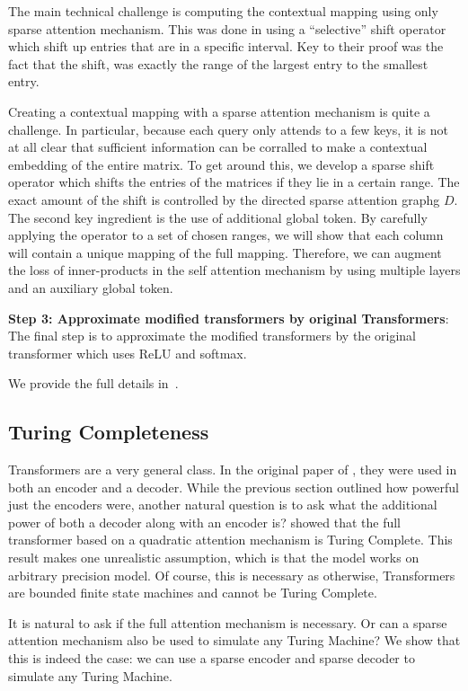     The main technical challenge is computing the contextual mapping using only sparse attention mechanism. 
    This was done in \cite{Yun19} using a ``selective'' shift operator which shift up entries that are in a 
    specific interval. Key to their proof was the fact that the shift, was exactly the range of the largest 
    entry to the smallest entry.  
    
    Creating a contextual mapping with a sparse attention mechanism is quite a challenge.
    In particular, because each query only attends to a few keys, it is not at all clear
    that sufficient information can be corralled to make a contextual embedding of the 
    entire matrix. To get around this, we develop a sparse shift operator which shifts the entries of the matrices if they lie in a certain range. The exact amount of the shift is controlled by the directed sparse attention graphg $D$. The second key ingredient is the use of additional global token.  By carefully applying the operator
    to a set of chosen ranges, we will show that each column will contain a unique mapping of the
    full mapping.   Therefore, we can   
    augment the loss of inner-products in the self attention mechanism by using multiple 
    layers and an auxiliary global token. 
    
\textbf{Step 3: Approximate modified transformers by original Transformers}: The final 
step is to approximate the modified transformers by the original transformer which uses ReLU and 
softmax. 

We provide the full details in~.

\subsection{Turing Completeness}
Transformers are a very general class. In the original paper of \citet{vaswani2017attention}, they were used 
in both an encoder and a decoder. While the previous section outlined how powerful just the encoders were,  another natural question is to ask what the
additional power of both a decoder along with an encoder is? \citet{Perez19} showed that the 
full  transformer based on a quadratic attention mechanism is Turing Complete. This result 
makes one  unrealistic assumption, which is that the model works on arbitrary precision 
model. Of course,  this is necessary as otherwise, Transformers are bounded finite 
state machines and cannot be Turing Complete. 

It is natural to ask if the full attention mechanism is necessary. Or can a 
sparse attention mechanism also be used to simulate any Turing Machine? 
We show that this is indeed the case: we can use a sparse encoder and sparse decoder
to simulate any Turing Machine. 

